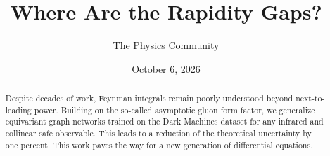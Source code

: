 \documentclass[11pt]{article}
\title{Where Are the Rapidity Gaps?}
\author{The Physics Community}
\date{October 6, 2026}
\begin{document}
\maketitle
\begin{abstract}
Despite decades of work, Feynman integrals remain poorly understood
beyond next-to-leading power. Building on the so-called asymptotic gluon
form factor, we generalize equivariant graph networks trained on the
Dark Machines dataset for any infrared and collinear safe observable.
This leads to a reduction of the theoretical uncertainty by one percent.
This work paves the way for a new generation of differential equations.
\end{abstract}
\tableofcontents





\nocite{*}


\end{document}
